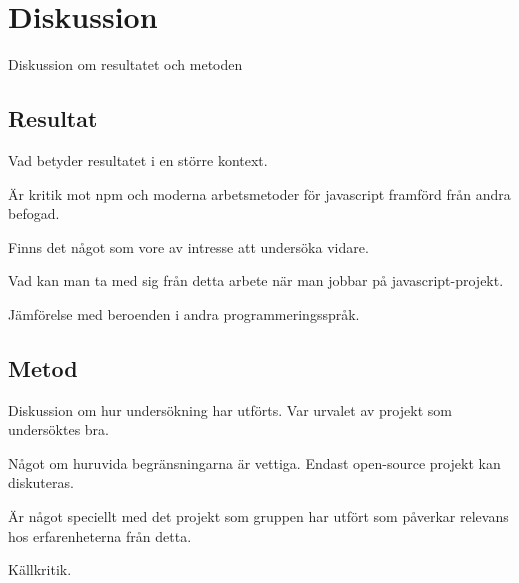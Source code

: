 \section{Diskussion}
\label{sec:joel_o-discussion}
Diskussion om resultatet och metoden

\subsection{Resultat}
\label{subsec:tim-discussion-results}
Vad betyder resultatet i en större kontext.

Är kritik mot npm och moderna arbetsmetoder för javascript framförd från andra befogad.

Finns det något som vore av intresse att undersöka vidare.

Vad kan man ta med sig från detta arbete när man jobbar på javascript-projekt.

Jämförelse med beroenden i andra programmeringsspråk.

\subsection{Metod}
\label{subsec:joel_o-discussion-method}
Diskussion om hur undersökning har utförts. Var urvalet av projekt som undersöktes bra.

Något om huruvida begränsningarna är vettiga. Endast open-source projekt kan diskuteras.

Är något speciellt med det projekt som gruppen har utfört som påverkar relevans hos erfarenheterna från detta.

Källkritik.
